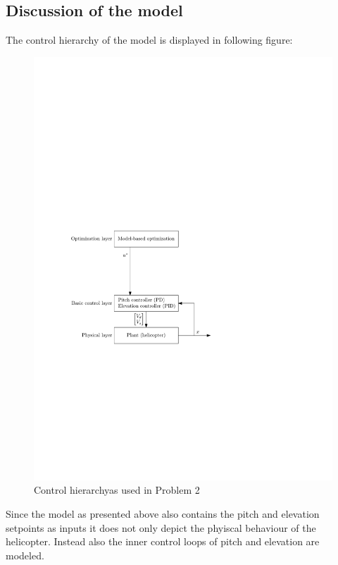 \subsection{Discussion of the model}\label{sec:prob22}
The control hierarchy of the model is displayed in following figure:
\begin{figure}[h]
	\centering
	\includegraphics[width=1.0\textwidth]{figures/layers_openloop.pdf}
	\caption[Control hierarchy as used in Problem 2]{Control hierarchy\footnotemark as used in Problem 2}
	\label{fig:layers_openloop}
\end{figure}
\newline
Since the model as presented above also contains the pitch and elevation setpoints as inputs it does not only depict the phyiscal behaviour of the helicopter. Instead also the inner control loops of pitch and elevation are modeled.
